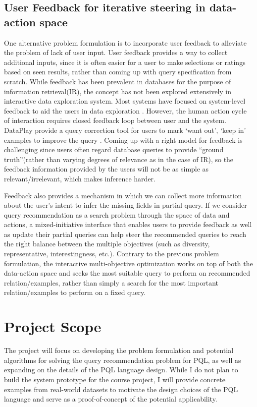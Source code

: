 \documentclass{sig-alternate-05-2015}
\begin{document}
\subsection{User Feedback for iterative steering in data-action space}
One alternative problem formulation is to incorporate user feedback to alleviate the problem of lack of user input. 
User feedback provides a way to collect additional inputs, since it is often easier for a user to make selections or ratings based on seen results, rather than coming up with query specification from scratch. While feedback has been prevalent in databases for the purpose of information retrieval(IR), the concept has not been explored extensively in interactive data exploration system. Most systems have focused on system-level feedback to aid the users in data exploration \cite{Nandi2013,Jiang2015}. However, the human action cycle of interaction requires closed feedback loop between user and the system\cite{Norman2013}. DataPlay provide a query correction tool for users to mark `want out', `keep in' examples to improve the query \cite{Abouzied2012}. Coming up with a right model for feedback is challenging since users often regard database queries to provide ``ground truth''(rather than varying degrees of relevance as in the case of IR), so the feedback information provided by the users will not be as simple as relevant/irrelevant, which makes inference harder.
\par Feedback also provides a mechanism in which we can collect more information about the user's intent to infer the missing fields in partial query. If we consider query recommendation as a search problem through the space of data and actions, a mixed-initiative interface that enables users to provide feedback as well as update their partial queries can help steer the recommended queries to reach the right balance between the multiple objectives (such as diversity, representative, interestingness, etc.). Contrary to the previous problem formulation, the interactive multi-objective optimization works on top of both the data-action space and seeks the most suitable query to perform on recommended relation/examples, rather than simply a search for the most important relation/examples to perform on a fixed query.
\section{Project Scope}
The project will focus on developing the problem formulation and potential algorithms for solving the query recommendation problem for PQL, as well as expanding on the details of the PQL language design. While I do not plan to build the system prototype for the course project, I will provide concrete examples from real-world datasets to motivate the design choices of the PQL language and serve as a proof-of-concept of the potential applicability.

  
\end{document}
